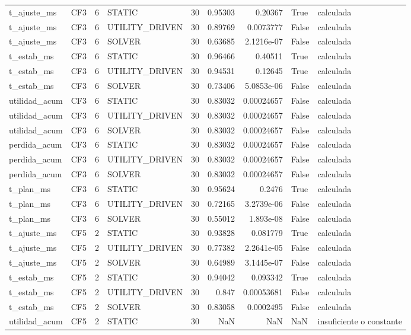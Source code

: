 \begin{tabular}{llrlrrrll}
t_ajuste_ms & CF3 & 6 & STATIC & 30 & 0.95303 & 0.20367 & True & calculada \\
t_ajuste_ms & CF3 & 6 & UTILITY_DRIVEN & 30 & 0.89769 & 0.0073777 & False & calculada \\
t_ajuste_ms & CF3 & 6 & SOLVER & 30 & 0.63685 & 2.1216e-07 & False & calculada \\
t_estab_ms & CF3 & 6 & STATIC & 30 & 0.96466 & 0.40511 & True & calculada \\
t_estab_ms & CF3 & 6 & UTILITY_DRIVEN & 30 & 0.94531 & 0.12645 & True & calculada \\
t_estab_ms & CF3 & 6 & SOLVER & 30 & 0.73406 & 5.0853e-06 & False & calculada \\
utilidad_acum & CF3 & 6 & STATIC & 30 & 0.83032 & 0.00024657 & False & calculada \\
utilidad_acum & CF3 & 6 & UTILITY_DRIVEN & 30 & 0.83032 & 0.00024657 & False & calculada \\
utilidad_acum & CF3 & 6 & SOLVER & 30 & 0.83032 & 0.00024657 & False & calculada \\
perdida_acum & CF3 & 6 & STATIC & 30 & 0.83032 & 0.00024657 & False & calculada \\
perdida_acum & CF3 & 6 & UTILITY_DRIVEN & 30 & 0.83032 & 0.00024657 & False & calculada \\
perdida_acum & CF3 & 6 & SOLVER & 30 & 0.83032 & 0.00024657 & False & calculada \\
t_plan_ms & CF3 & 6 & STATIC & 30 & 0.95624 & 0.2476 & True & calculada \\
t_plan_ms & CF3 & 6 & UTILITY_DRIVEN & 30 & 0.72165 & 3.2739e-06 & False & calculada \\
t_plan_ms & CF3 & 6 & SOLVER & 30 & 0.55012 & 1.893e-08 & False & calculada \\
t_ajuste_ms & CF5 & 2 & STATIC & 30 & 0.93828 & 0.081779 & True & calculada \\
t_ajuste_ms & CF5 & 2 & UTILITY_DRIVEN & 30 & 0.77382 & 2.2641e-05 & False & calculada \\
t_ajuste_ms & CF5 & 2 & SOLVER & 30 & 0.64989 & 3.1445e-07 & False & calculada \\
t_estab_ms & CF5 & 2 & STATIC & 30 & 0.94042 & 0.093342 & True & calculada \\
t_estab_ms & CF5 & 2 & UTILITY_DRIVEN & 30 & 0.847 & 0.00053681 & False & calculada \\
t_estab_ms & CF5 & 2 & SOLVER & 30 & 0.83058 & 0.0002495 & False & calculada \\
utilidad_acum & CF5 & 2 & STATIC & 30 & NaN & NaN & NaN & insuficiente o constante \\

\end{tabular}
